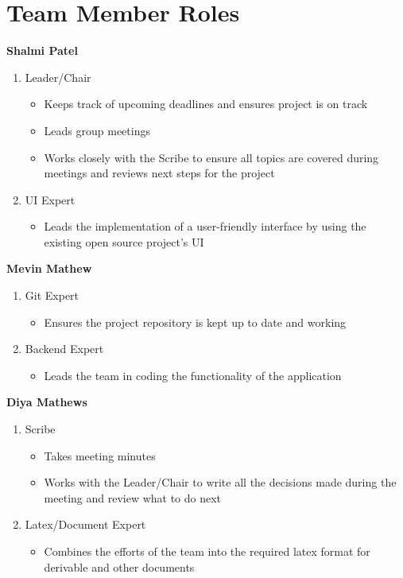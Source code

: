 \documentclass{article}
\begin{document}
\newpage

\section{Team Member Roles}
\textbf{Shalmi Patel}
\begin{enumerate}
  \item Leader/Chair
  \begin{itemize}
    \item Keeps track of upcoming deadlines and ensures project is on track
    \item Leads group meetings
    \item Works closely with the Scribe to ensure all topics are covered during meetings and reviews next steps for the project
  \end{itemize}
  \item UI Expert
  \begin{itemize}
    \item Leads the implementation of a user-friendly interface by using the existing open source project’s UI
  \end{itemize}
\end{enumerate} 

\vspace{5mm}

\textbf{Mevin Mathew}
\begin{enumerate}
  \item Git Expert
  \begin{itemize}
    \item Ensures the project repository is kept up to date and working
  \end{itemize}
  \item Backend Expert
  \begin{itemize}
    \item Leads the team in coding the functionality of the application
  \end{itemize}
\end{enumerate}

\vspace{5mm}

\textbf{Diya Mathews}
\begin{enumerate}
  \item Scribe
  \begin{itemize}
    \item Takes meeting minutes
    \item Works with the Leader/Chair to write all the decisions made during the meeting and review what to do next
  \end{itemize}
  \item Latex/Document Expert
  \begin{itemize}
    \item Combines the efforts of the team into the required latex format for derivable and other documents
  \end{itemize}
\end{enumerate}
\end{document}
